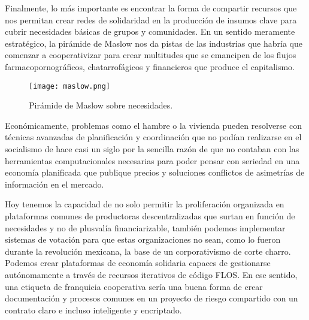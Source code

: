 Finalmente, lo más importante es encontrar la forma de compartir recursos que nos permitan crear redes de solidaridad en la producción de insumos clave para cubrir necesidades básicas de grupos y comunidades. En un sentido meramente estratégico, la pirámide de Maslow nos da pistas de las industrias que habría que comenzar a cooperativizar para crear multitudes que se emancipen de los flujos farmacopornográficos, chatarrofágicos y financieros que produce el capitalismo.

\begin{figure}[htbp]
	\centering
	\texttt{[image: maslow.png]}
	\caption{Pirámide de Maslow sobre necesidades.}
	\label{fig:maslow}
\end{figure}

Económicamente, problemas como el hambre o la vivienda pueden resolverse con técnicas avanzadas de planificación y coordinación que no podían realizarse en el socialismo de hace casi un siglo por la sencilla razón de que no contaban con las herramientas computacionales necesarias para poder pensar con seriedad en una economía planificada que publique precios y soluciones conflictos de asimetrías de información en el mercado.

Hoy tenemos la capacidad de no solo permitir la proliferación organizada en plataformas comunes de productoras descentralizadas que surtan en función de necesidades y no de plusvalía financiarizable, también podemos implementar sistemas de votación para que estas organizaciones no sean, como lo fueron durante la revolución mexicana, la base de un corporativismo de corte charro. Podemos crear plataformas de economía solidaria capaces de gestionarse autónomamente a través de recursos iterativos de código FLOS. En ese sentido, una etiqueta de franquicia cooperativa sería una buena forma de crear documentación y procesos comunes en un proyecto de riesgo compartido con un contrato claro e incluso inteligente y encriptado.